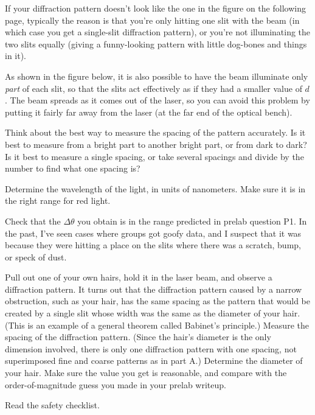 If your diffraction pattern doesn't look like the
one in the figure on the following page, typically the
reason is that you're only hitting one slit with the beam
(in which case you get a single-slit diffraction pattern),
or you're not illuminating the two slits equally (giving
a funny-looking pattern with little dog-bones and things in it).

As shown in the figure below, it is also possible to have the
beam illuminate only \emph{part} of each slit, so that the slits
act effectively as if they had a smaller value of $d$. The beam
spreads as it comes out of the laser, so you can avoid this
problem by putting it fairly far away from the laser (at the far
end of the optical bench).


Think about the best way to measure the spacing of the
pattern accurately. Is it best to measure from a bright part
to another bright part, or from dark to dark? Is it best to
measure a single spacing, or take several spacings and
divide by the number to find what one spacing is?

Determine the wavelength of the light, in units of
nanometers. Make sure it is in the right range for red
light.

Check that the $\Delta\theta$ you obtain is in the range
predicted in prelab question P1. In the past, I've seen
cases where groups got goofy data, and I suspect that it
was because they were hitting a place on the slits where
there was a scratch, bump, or speck of dust.


Pull out one of your own hairs, hold it in the laser beam,
and observe a diffraction pattern. It turns out that the
diffraction pattern caused by a narrow obstruction, such as
your hair, has the same spacing as the pattern that would be
created by a single slit whose width was the same as the
diameter of your hair. (This is an example of a general
theorem called Babinet's principle.) Measure the spacing of
the diffraction pattern. (Since the hair's diameter is the
only dimension involved, there is only one diffraction
pattern with one spacing, not superimposed fine and coarse
patterns as in part A.) Determine the diameter of your hair.
Make sure the value you get is reasonable, and compare with
the order-of-magnitude guess you made in your prelab writeup.

\prelab

Read the safety checklist.

